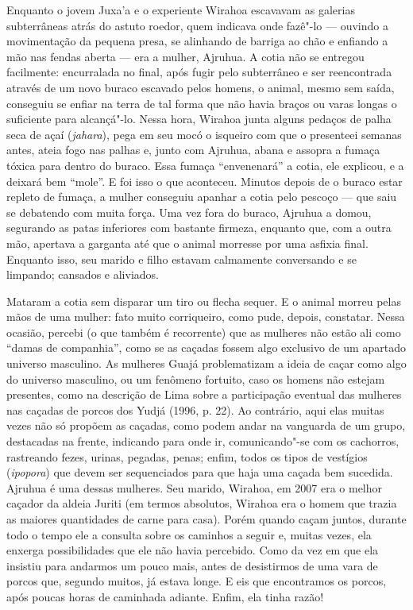 Enquanto o jovem Juxa'a e o experiente Wirahoa escavavam as galerias
subterrâneas atrás do astuto roedor, quem indicava onde fazê"-lo ---
ouvindo a movimentação da pequena presa, se alinhando de barriga ao chão
e enfiando a mão nas fendas aberta --- era a mulher, Ajruhua. A cotia não
se entregou facilmente: encurralada no final, após fugir pelo
subterrâneo e ser reencontrada através de um novo buraco escavado pelos
homens, o animal, mesmo sem saída, conseguiu se enfiar na terra de tal
forma que não havia braços ou varas longas o suficiente para alcançá"-lo.
Nessa hora, Wirahoa junta alguns pedaços de palha seca de açaí
(\emph{jahara}), pega em seu mocó o isqueiro com que o presenteei
semanas antes, ateia fogo nas palhas e, junto com Ajruhua, abana e
assopra a fumaça tóxica para dentro do buraco. Essa fumaça ``envenenará''
a cotia, ele explicou, e a deixará bem ``mole''. E foi isso o que
aconteceu. Minutos depois de o buraco estar repleto de fumaça, a mulher
conseguiu apanhar a cotia pelo pescoço --- que saiu se debatendo com muita
força. Uma vez fora do buraco, Ajruhua a domou, segurando as patas
inferiores com bastante firmeza, enquanto que, com a outra mão, apertava
a garganta até que o animal morresse por uma asfixia final. Enquanto
isso, seu marido e filho estavam calmamente conversando e se limpando;
cansados e aliviados.

Mataram a cotia sem disparar um tiro ou flecha sequer. E o animal morreu
pelas mãos de uma mulher: fato muito corriqueiro, como pude, depois,
constatar. Nessa ocasião, percebi (o que também é recorrente) que as
mulheres não estão ali como ``damas de companhia'', como se as caçadas
fossem algo exclusivo de um apartado universo masculino. As mulheres
Guajá problematizam a ideia de caçar como algo do universo masculino, ou
um fenômeno fortuito, caso os homens não estejam presentes, como na
descrição de Lima sobre a participação eventual das mulheres nas caçadas
de porcos dos Yudjá (1996, p. 22). Ao contrário, aqui elas muitas vezes
não só propõem as caçadas, como podem andar na vanguarda de um grupo,
destacadas na frente, indicando para onde ir, comunicando"-se com os
cachorros, rastreando fezes, urinas, pegadas, penas; enfim, todos os
tipos de vestígios (\emph{ipopora}) que devem ser sequenciados para que
haja uma caçada bem sucedida. Ajruhua é uma dessas mulheres. Seu marido,
Wirahoa, em 2007 era o melhor caçador da aldeia Juriti (em termos
absolutos, Wirahoa era o homem que trazia as maiores quantidades de
carne para casa). Porém quando caçam juntos, durante todo o tempo ele a
consulta sobre os caminhos a seguir e, muitas vezes, ela enxerga
possibilidades que ele não havia percebido. Como da vez em que ela
insistiu para andarmos um pouco mais, antes de desistirmos de uma vara
de porcos que, segundo muitos, já estava longe. E eis que encontramos os
porcos, após poucas horas de caminhada adiante. Enfim, ela tinha razão!


